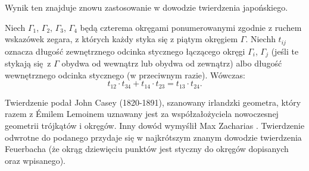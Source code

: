 Wynik ten znajduje znowu zastosowanie w dowodzie twierdzenia japońskiego. %

\begin{theorem}[Caseya, 1866]
%
    Niech $\Gamma_1$, $\Gamma_2$, $\Gamma_3$, $\Gamma_4$ będą czterema okręgami ponumerowanymi zgodnie z ruchem wskazówek zegara, z których każdy styka się z piątym okręgiem $\Gamma$.
    Niechh $t_{ij}$ oznacza długość zewnętrznego odcinka stycznego łączącego okręgi $\Gamma_i$, $\Gamma_j$ (jeśli te stykają się z $\Gamma$ obydwa od wewnątrz lub obydwa od zewnątrz) albo długość wewnętrznego odcinka stycznego (w przeciwnym razie).
    Wówczas:
    \begin{equation}
        t_{12} \cdot t_{34} + t_{14} \cdot t_{23} = t_{13} \cdot t_{24}.
    \end{equation}
\end{theorem}

Twierdzenie podał John Casey (1820-1891), szanowany irlandzki geometra, który razem z Émilem Lemoinem uznawany jest za współzałożyciela nowoczesnej geometrii trójkątów i okręgów.
%
Inny dowód wymyślił Max Zacharias \cite{zacharias_1942}.
Twierdzenie odwrotne do podanego przydaje się w najkrótszym znanym dowodzie twierdzenia Feuerbacha (że okrąg dziewięciu punktów jest styczny do okręgów dopisanych oraz wpisanego).

%